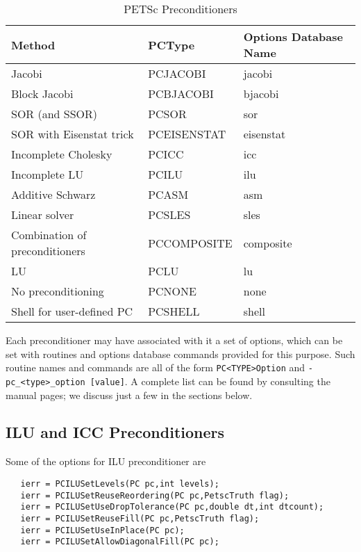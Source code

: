 \begin{table}
\begin{center}
\begin{tabular}{lll}
{\bf Method}    &{\bf PCType}   & {\bf Options Database Name}\\
\hline
Jacobi                               & PCJACOBI      & jacobi\\
Block Jacobi                         & PCBJACOBI     & bjacobi\\
SOR (and SSOR)                       & PCSOR         & sor\\
SOR with Eisenstat trick             & PCEISENSTAT   & eisenstat\\
Incomplete Cholesky                  & PCICC         & icc\\
Incomplete LU                        & PCILU         & ilu\\
Additive Schwarz                     & PCASM         & asm\\
Linear solver                        & PCSLES        & sles \\
Combination of preconditioners       & PCCOMPOSITE   & composite \\
\hline
LU                                   & PCLU          & lu\\
No preconditioning                   & PCNONE        & none\\
Shell for user-defined PC            & PCSHELL       & shell\\
\hline
\end{tabular}
\end{center}
\caption{PETSc Preconditioners}
\label{tab:pcdefaults}
\end{table}

Each preconditioner may have associated with it a set of options,
which can be set with routines and options database commands provided
for this purpose.  Such routine names and commands are all of the form
{\tt PC<TYPE>Option} and {\tt -pc\_<type>\_option [value]}.  A
complete list can be found by consulting the manual pages; we discuss
just a few in the sections below.

\subsection{ILU and ICC Preconditioners}
\label{sec:ilu_icc}

Some of the options for ILU preconditioner are 
\begin{verbatim}
   ierr = PCILUSetLevels(PC pc,int levels);
   ierr = PCILUSetReuseReordering(PC pc,PetscTruth flag);
   ierr = PCILUSetUseDropTolerance(PC pc,double dt,int dtcount);
   ierr = PCILUSetReuseFill(PC pc,PetscTruth flag);
   ierr = PCILUSetUseInPlace(PC pc); 
   ierr = PCILUSetAllowDiagonalFill(PC pc);
\end{verbatim}
 
 
 

